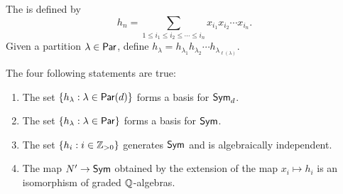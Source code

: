 The  is defined by
\begin{equation}
    h_n = \sum_{1 \leq i_1 \leq i_2 \leq \cdots \leq i_n} x_{i_1}x_{i_2}\cdots x_{i_n}.
\end{equation}
Given a partition \(\lambda \in \operatorname{\mathsf{Par}}\), define \(h_\lambda = h_{\lambda_1}h_{\lambda_2}\cdots h_{\lambda_{\ell(\lambda)}}\).

\begin{theorem} \label{thm:hn_sym}
		The four following statements are true:
		\begin{enumerate}
				\item \label{item:hl_symd_basis}
							The set \(\{h_\lambda : \lambda \in \operatorname{\mathsf{Par}}(d)\}\) forms a basis for \(\operatorname{\mathsf{Sym}}_d\).
				\item \label{item:hl_sym_basis}
							The set \(\{h_\lambda : \lambda \in \operatorname{\mathsf{Par}}\}\) forms a basis for \(\operatorname{\mathsf{Sym}}\).
				\item \label{item:hn_sym_generates}
							The set \(\{h_i : i \in \mathbb{Z}_{> 0}\}\) generates \(\operatorname{\mathsf{Sym}}\) and is algebraically independent.
				\item \label{item:hn_sym_graded_isom}
							The map \(N' \to \operatorname{\mathsf{Sym}}\) obtained by the extension of the map \(x_i \mapsto h_i\) is an isomorphism of graded \(\mathbb{Q}\)-algebras.
		\end{enumerate}
\end{theorem}

